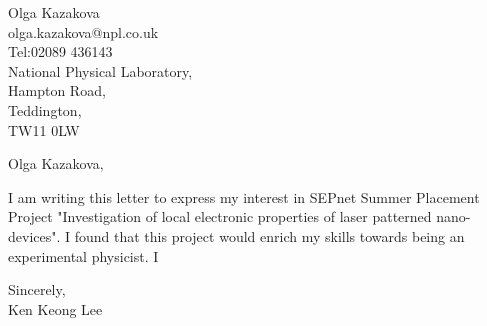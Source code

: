 \documentclass[11pt]{letter} %
\begin{document}

\begin{letter}{Olga Kazakova\\olga.kazakova@npl.co.uk\\Tel:02089 436143\\National Physical Laboratory,\\Hampton Road,\\Teddington,\\TW11 0LW}


\opening{Olga Kazakova,} 

I am writing this letter to express my interest in SEPnet Summer Placement Project "Investigation of local electronic properties of laser patterned nano-devices". I found that this project would enrich my skills towards being an experimental physicist. I 


\closing{Sincerely,\\Ken Keong Lee}




\end{letter}
\end{document}
